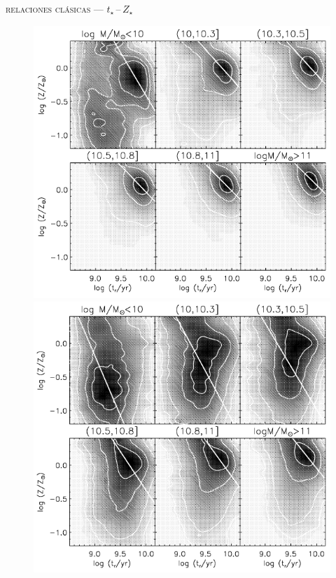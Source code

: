 \documentclass[xcolor=dvipsnames,fleqn,hyperref={colorlinks,citecolor=black,linkcolor=black,urlcolor=black}]{beamer}
\begin{document}
\begin{frame}{\textsc{relaciones clásicas --- $t_\star\,$--$\,Z_\star$}}



\begin{figure}
\includegraphics[scale=0.7]{img/gallazzi2005-12}
\includegraphics[scale=0.7]{img/gallazzi2005-11}
\end{figure}


\end{frame}
\end{document}
